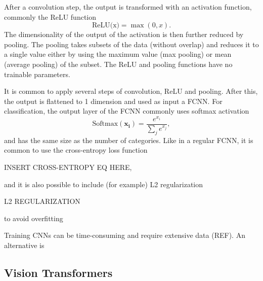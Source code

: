 After a convolution step, the output is transformed with an activation function, commonly the ReLU function
\begin{equation}
    \text{ReLU(x)} = \max(0,x).
\end{equation}
The dimensionality of the output of the activation is then further reduced by pooling. The pooling takes subsets of the data (without overlap) and reduces it to a single value either by using the maximum value (max pooling) or mean (average pooling) of the subset. The ReLU and pooling functions have no trainable parameters.

It is common to apply several steps of convolution, ReLU and pooling. After this, the output is flattened to 1 dimension and used as input a FCNN. For classification, the output layer of the FCNN commonly uses softmax activation
\begin{equation}
\label{eq:softmax}
\text{Softmax}(\mathbf{x_i}) = \frac{e^{x_i}}{\sum_{j} e^{x_j}},
\end{equation}
and has the same size as the number of categories. Like in a regular FCNN, it is common to use the cross-entropy loss function

INSERT CROSS-ENTROPY EQ HERE,

and it is also possible to include (for example) L2 regularization

L2 REGULARIZATION

to avoid overfitting

Training CNNs can be time-consuming and require extensive data (REF). An alternative is 


\subsection{Vision Transformers} \label{ssec:vit}

